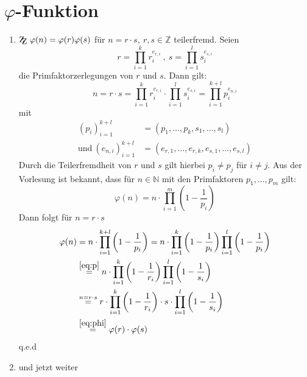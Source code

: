 \documentclass[DIN, pagenumber=false, fontsize=11pt, parskip=half]{scrartcl}
\newcommand{\Z}[0]{\mathbb{Z}}
\newcommand{\N}[0]{\mathbb{N}}
\newcommand{\ZZ}{\mathrm{Z\kern-.3em\raise-0.5ex\hbox{Z}}}
\begin{document}
    \section{$\varphi$-Funktion}
    \begin{enumerate}[label=\alph*)]
        \item $\ZZ \ \varphi(n) = \varphi(r) \varphi(s)$ für $n = r \cdot s, \ r, s \in \Z$ teilerfremd.
        Seien
        \begin{equation*}
            r = \prod_{i=1}^k{r_i^{e_{r,i}}} \ , \ s = \prod_{i=1}^l{s_i^{e_{s,i}}}
        \end{equation*}
        die Primfaktorzerlegungen von $r$ und $s$. Dann gilt:
        \begin{equation*}
            n = r \cdot s = \prod_{i=1}^k{r_i^{e_{r,i}}} \cdot \prod_{i=1}^l{s_i^{e_{s,i}}} = \prod_{i=1}^{k+l}{p_i^{e_{n, i}}}
        \end{equation*}
        mit 
        \begin{align}
            (p_i)_{i=1}^{k+l} &= (p_1, \dots, p_k, s_1, \dots, s_l) \label{eq:p}\\
            \text{und} \ (e_{n,i})_{i=1}^{k+l} &= (e_{r, 1}, \dots, e_{r, k}, e_{s, 1}, \dots, e_{s, l})
        \end{align}
        Durch die Teilerfremdheit von $r$ und $s$ gilt hierbei $p_i \neq p_j$ für $i \neq j$.
        Aus der Vorlesung ist bekannt, dass für $n \in \N$ mit den Primfaktoren $p_1, \dots, p_m$ gilt:
        \begin{equation}
            \varphi(n) = n \cdot \prod_{i=1}^m{\left(1 - \frac{1}{p_i}\right)}
            \label{eq:phi}
        \end{equation}
        Dann folgt für $n = r \cdot s$
        \begin{align*}
            \varphi(n) &= n \cdot \prod_{i = 1}^{k+l}{\left(1 - \frac{1}{p_i}\right)} =
            n \cdot \prod_{i=1}^k{\left(1 - \frac{1}{p_i}\right)} \prod_{i=1}^l{\left(1 - \frac{1}{p_i}\right)} \\
            &\stackrel{\ref{eq:p}}{=} n \cdot \prod_{i=1}^k{\left(1 - \frac{1}{r_i}\right)} \prod_{i=1}^l{\left(1 - \frac{1}{s_i}\right)} \\
            & \stackrel{n=r \cdot s}{=} r \cdot \prod_{i=1}^k{\left(1 - \frac{1}{r_i}\right)} \cdot s \cdot \prod_{i=1}^l{\left(1 - \frac{1}{s_i}\right)} \\
            &\stackrel{\ref{eq:phi}}{=} \varphi(r) \cdot \varphi(s)
        \end{align*}
        q.e.d

        \item und jetzt weiter
    \end{enumerate}
\end{document}
